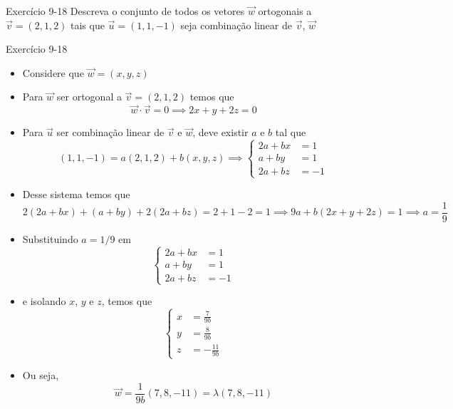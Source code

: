 \begin{frame}[c]{Exercício 9-18}
    Descreva o conjunto de todos os vetores \(\vec{w}\) ortogonais a \(\vec{v}=(2,1,2)\) tais que
    \(\vec{u}=(1,1,-1)\) seja combinação linear de \(\vec{v}\), \(\vec{w}\)
\end{frame}

\begin{frame}{Exercício 9-18}
    \begin{itemize}
        \item Considere que \(\vec{w}=(x,y,z)\)
        \item Para \(\vec{w}\) ser ortogonal a \(\vec{v}=(2,1,2)\) temos que
            \[
                \vec{w}\cdot \vec{v}=0 \implies 2x+y+2z=0
            \]
        \item Para \(\vec{u}\) ser combinação linear de \(\vec{v}\) e \(\vec{w}\), deve existir \(a\) e \(b\) tal que
            \[
                (1,1,-1)=a(2,1,2)+b(x,y,z) \implies
                \begin{cases}
                    2a+bx &= 1 \\ a+by&=1 \\ 2a+bz&=-1
                \end{cases}
            \]
        \item Desse sistema temos que
            \[
                2(2a+bx)+(a+by)+2(2a+bz)=2+1-2=1 \implies 9a + b(2x+y+2z)=1 \implies a=\frac{1}{9}
            \]
    \end{itemize}

\end{frame}

\begin{frame}{}
    \begin{itemize}
        \item Substituindo \(a=1/9\) em
            \[
                \begin{cases}
                    2a+bx &= 1 \\ a+by&=1 \\ 2a+bz&=-1
                \end{cases}
            \]
        \item[]
            e isolando \(x\), \(y\) e \(z\), temos que
            \[
                \begin{cases}
                    x&=\frac{7}{9b} \\ y&=\frac{8}{9b} \\ z&=-\frac{11}{9b}
                \end{cases}
            \]
        \item Ou seja,
            \[
                \vec{w}=\frac{1}{9b}(7,8,-11)=\lambda (7,8,-11)
            \]

    \end{itemize}
\end{frame}

